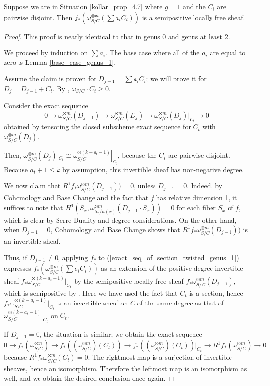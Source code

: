 \begin{lemma}\label{inductive_step_genus_1}
Suppose we are in Situation \ref{kollar_prop_4.7} where $g=1$ and the $C_i$ are pairwise disjoint.
Then $f_{*}(\omega_{S/C}^{\otimes m}(\sum a_iC_i))$ is a semipositive locally free sheaf.
\end{lemma}
\begin{proof}
This proof is nearly identical to that in genus 0 and genus at least 2.

We proceed by induction on $\sum a_i$.
The base case where all of the $a_i$ are equal to zero is Lemma \ref{base_case_genus_1}.

Assume the claim is proven for $D_{j-1}=\sum a_iC_i$; we will prove it for $D_{j}=D_{j-1}+C_t$.
By , $\omega_{S/C}\cdot C_t\ge0$.

Consider the exact sequence
\begin{equation}\label{exact_seq_of_section_twisted_genus_1}
0\to\omega_{S/C}^{\otimes m}(D_{j-1})\to\omega_{S/C}^{\otimes m}(D_j)\to \omega_{S/C}^{\otimes m}(D_j)|_{C_t}\to0
\end{equation}
obtained by tensoring the closed subscheme exact sequence for $C_t$ with $\omega_{S/C}^{\otimes m}(D_j)$.

Then, $\omega_{S/C}^{\otimes m}(D_j)|_{C_t}\cong \omega_{S/C}^{\otimes (k-a_{t}-1)}|_{C_t}$, because the $C_i$ are pairwise disjoint.
Because $a_{t}+1\le k$ by assumption, this invertible sheaf has non-negative degree.

We now claim that $R^{1}f_{*}\omega_{S/C}^{\otimes m}(D_{j-1}))=0$, unless $D_{j-1}=0$.
Indeed, by Cohomology and Base Change and the fact that $f$ has relative dimension 1, it suffices to note that $H^{1}(S_x,\omega_{S_x/\kappa(x)}^{\otimes m}(D_{j-1}\cdot S_x))=0$ for each fiber $S_x$ of $f$, which is clear by Serre Duality and degree considerations.
On the other hand, when $D_{j-1}=0$, Cohomology and Base Change shows that $R^{1}f_{*}\omega_{S/C}^{\otimes m}(D_{j-1}))$ is an invertible sheaf.


Thus, if $D_{j-1}\neq0$, applying $f_{*}$ to (\ref{exact_seq_of_section_twisted_genus_1}) expresses $f_{*}(\omega_{S/C}^{\otimes m}(\sum a_iC_i))$ as an extension of the positive degree invertible sheaf $f_{*}\omega_{S/C}^{\otimes (k-a_{t}-1)}|_{C_t}$ by the semipositive locally free sheaf $f_{*}\omega_{S/C}^{\otimes m}(D_{j-1})$, which is semipositive by .
Here we have used the fact that $C_t$ is a section, hence $f_{*}\omega_{S/C}^{\otimes (k-a_{t}-1)}|_{C_t}$ is an invertible sheaf on $C$ of the same degree as that of $\omega_{S/C}^{\otimes (k-a_{t}-1)}|_{C_t}$ on $C_t$.

If $D_{j-1}=0$, the situation is similar; we obtain the exact sequence
$$
0\to f_{*}(\omega_{S/C}^{\otimes m})\to f_{*}((\omega_{S/C}^{\otimes m})(C_t))\to f_{*}((\omega_{S/C}^{\otimes m})(C_t))|_{C_t}\to R^{1}f_{*}(\omega_{S/C}^{\otimes m})\to0
$$
because $R^{1}f_{*}\omega_{S/C}^{\otimes m}(C_t)=0$.
The rightmost map is a surjection of invertible sheaves, hence an isomorphism.
Therefore the leftmost map is an isomorphism as well, and we obtain the desired conclusion once again.
\end{proof}



